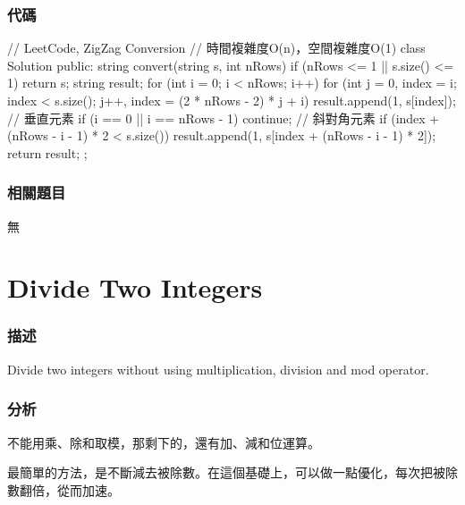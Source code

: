 \subsubsection{代碼}
\begin{Code}
// LeetCode, ZigZag Conversion
// 時間複雜度O(n)，空間複雜度O(1)
class Solution {
public:
    string convert(string s, int nRows) {
        if (nRows <= 1 || s.size() <= 1) return s;
        string result;
        for (int i = 0; i < nRows; i++) {
            for (int j = 0, index = i; index < s.size();
                    j++, index = (2 * nRows - 2) * j + i) {
                result.append(1, s[index]);  // 垂直元素
                if (i == 0 || i == nRows - 1) continue;   // 斜對角元素
                if (index + (nRows - i - 1) * 2 < s.size())
                    result.append(1, s[index + (nRows - i - 1) * 2]);
            }
        }
        return result;
    }
};
\end{Code}


\subsubsection{相關題目}
\begindot
\item 無
\myenddot


\section{Divide Two Integers} %
\label{sec:divide-two-integers}


\subsubsection{描述}
Divide two integers without using multiplication, division and mod operator.


\subsubsection{分析}
不能用乘、除和取模，那剩下的，還有加、減和位運算。

最簡單的方法，是不斷減去被除數。在這個基礎上，可以做一點優化，每次把被除數翻倍，從而加速。


